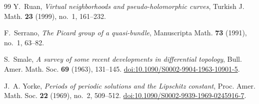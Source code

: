 \begin{thebibliography}{99}
Y.~Ruan,
\emph{Virtual neighborhoods and pseudo-holomorphic curves},
Turkish J. Math. \textbf{23} (1999), no.~1, 161--232.

F.~Serrano,
\emph{The Picard group of a quasi-bundle},
Manuscripta Math. \textbf{73} (1991), no.~1, 63--82.

S.~Smale,
\emph{A survey of some recent developments in differential topology},
Bull. Amer. Math. Soc. \textbf{69} (1963), 131--145.
\href{https://doi.org/10.1090/S0002-9904-1963-10901-5}{doi:10.1090/S0002-9904-1963-10901-5}.

J.~A. Yorke,
\emph{Periods of periodic solutions and the Lipschitz constant},
Proc. Amer. Math. Soc. \textbf{22} (1969), no.~2, 509--512.
\href{https://doi.org/10.1090/S0002-9939-1969-0245916-7}{doi:10.1090/S0002-9939-1969-0245916-7}.

\end{thebibliography}
